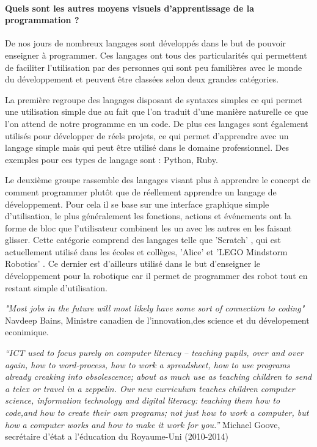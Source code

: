 \documentclass[12pt,francais]{report}
\begin{document}
\paragraph*{Quels sont les autres moyens visuels d'apprentissage de la programmation ?\\}

De nos jours de nombreux langages sont développés dans le but de pouvoir enseigner à programmer. Ces langages ont tous des particularités qui permettent de faciliter l'utilisation par des personnes qui sont peu familières avec le monde du développement et peuvent être classées selon deux grandes catégories.

La première regroupe des langages disposant de syntaxes simples ce qui permet une utilisation simple due au fait que l'on traduit d'une manière naturelle ce que l'on attend de notre programme en un code. De plus ces langages sont également utilisés pour développer de réels projets, ce qui permet d'apprendre avec un langage simple mais qui peut être utilisé dans le domaine professionnel. Des exemples pour ces types de langage sont : Python, Ruby.

Le deuxième groupe rassemble des langages visant plus à apprendre le concept de comment programmer plutôt que de réellement apprendre un langage de développement. Pour cela il se base sur une interface graphique simple d'utilisation, le plus généralement les fonctions, actions et événements ont la forme de bloc  que l'utilisateur combinent les un avec les autres en les faisant glisser. Cette catégorie comprend des langages telle que 'Scratch' \cite{ref17}, qui est actuellement utilisé dans les écoles et collèges, 'Alice' \cite{ref19} et 'LEGO Mindstorm Robotics' \cite{ref18}. Ce dernier est d'ailleurs utilisé dans le but d'enseigner le développement pour la robotique car il  permet de programmer des robot tout en restant simple d'utilisation.

\textit{"Most jobs in the future will most likely have some sort of connection to coding"}  Navdeep Bains, Ministre canadien de l'innovation,des science et du dévelopement econimique.

\textit{“ICT used to focus purely on computer literacy – teaching pupils, over and over again, how to word-process, how to work a spreadsheet, how to use programs already creaking into obsolescence; about as much use as teaching children to send a telex or travel in a zeppelin.
Our new curriculum teaches children computer science, information technology and digital literacy: teaching them how to code,and how to create their own programs; not just how to work a computer, but how a computer works and how to make it work for you.”}
Michael Goove, secrétaire d'état a l'éducation du Royaume-Uni (2010-2014) \cite{ref16}
\end{document}

